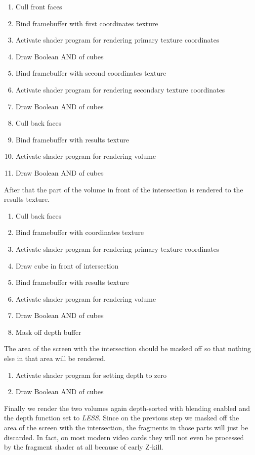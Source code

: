 \documentclass{report}
\begin{document}
\begin{enumerate}
  \item Cull front faces
  \item Bind framebuffer with first coordinates texture
  \item Activate shader program for rendering primary texture coordinates
  \item Draw Boolean AND of cubes
  \item Bind framebuffer with second coordinates texture
  \item Activate shader program for rendering secondary texture coordinates
  \item Draw Boolean AND of cubes
  \item Cull back faces
  \item Bind framebuffer with results texture
  \item Activate shader program for rendering volume
  \item Draw Boolean AND of cubes
\end{enumerate}

After that the part of the volume in front of the intersection is rendered to
the results texture.

\begin{enumerate}
  \item Cull back faces
  \item Bind framebuffer with coordinates texture
  \item Activate shader program for rendering primary texture coordinates
  \item Draw cube in front of intersection
  \item Bind framebuffer with results texture
  \item Activate shader program for rendering volume
  \item Draw Boolean AND of cubes
  \item Mask off depth buffer
\end{enumerate}

The area of the screen with the intersection should be masked off so that
nothing else in that area will be rendered.

\begin{enumerate}
  \item Activate shader program for setting depth to zero
  \item Draw Boolean AND of cubes
\end{enumerate}

Finally we render the two volumes again depth-sorted with blending enabled and
the depth function set to \emph{LESS}.  Since on the previous step we masked off
the area of the screen with the intersection, the fragments in those parts will
just be discarded.  In fact, on most modern video cards they will not even be
processed by the fragment shader at all because of early Z-kill.
\end{document}
